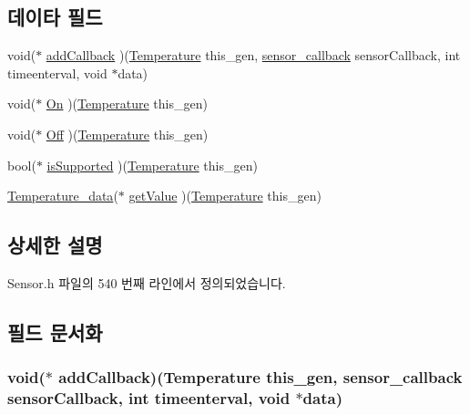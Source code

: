 \subsection*{데이타 필드}
\begin{DoxyCompactItemize}
\item 
void($\ast$ \hyperlink{struct___temperature_aa97759f4d5f8befb3dec5c8023640f63}{add\-Callback} )(\hyperlink{_sensor_8h_a9d4d4bb9117d2f01bf1bcde4e7108c6e}{Temperature} this\-\_\-gen, \hyperlink{_sensor_8h_ad8114207845fc5e0aa30832f0c718cd6}{sensor\-\_\-callback} sensor\-Callback, int timeenterval, void $\ast$data)
\item 
void($\ast$ \hyperlink{struct___temperature_af7b298c4d127ff352cd1771cb90bd108}{On} )(\hyperlink{_sensor_8h_a9d4d4bb9117d2f01bf1bcde4e7108c6e}{Temperature} this\-\_\-gen)
\item 
void($\ast$ \hyperlink{struct___temperature_a8c4b6d47c9f055fc483d5a46e565c756}{Off} )(\hyperlink{_sensor_8h_a9d4d4bb9117d2f01bf1bcde4e7108c6e}{Temperature} this\-\_\-gen)
\item 
bool($\ast$ \hyperlink{struct___temperature_a066c1b02fe31ddfb64ef783d1fefd1a2}{is\-Supported} )(\hyperlink{_sensor_8h_a9d4d4bb9117d2f01bf1bcde4e7108c6e}{Temperature} this\-\_\-gen)
\item 
\hyperlink{_sensor_8h_aa61939fab26530f076ca04c0a058a287}{Temperature\-\_\-data}($\ast$ \hyperlink{struct___temperature_a660cf710a2d1e34072bd9a1ab95d368b}{get\-Value} )(\hyperlink{_sensor_8h_a9d4d4bb9117d2f01bf1bcde4e7108c6e}{Temperature} this\-\_\-gen)
\end{DoxyCompactItemize}


\subsection{상세한 설명}


Sensor.\-h 파일의 540 번째 라인에서 정의되었습니다.



\subsection{필드 문서화}
\hypertarget{struct___temperature_aa97759f4d5f8befb3dec5c8023640f63}{
\subsubsection[{add\-Callback}]{\setlength{\rightskip}{0pt plus 5cm}void($\ast$  add\-Callback)({\bf Temperature} this\-\_\-gen, {\bf sensor\-\_\-callback} sensor\-Callback, int timeenterval, void $\ast$data)}}\label{struct___temperature_aa97759f4d5f8befb3dec5c8023640f63}


